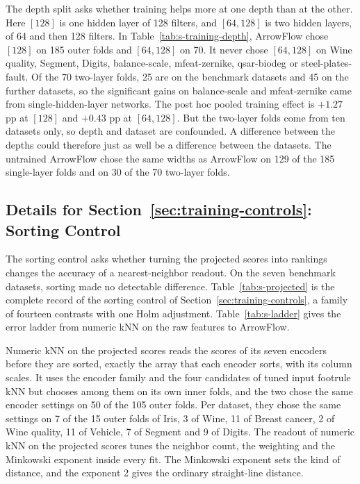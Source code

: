 The depth split asks whether training helps more at one depth than at the other. Here $[128]$ is one hidden layer of 128 filters, and $[64,128]$ is two hidden layers, of 64 and then 128 filters. In Table~\ref{tab:s-training-depth}, ArrowFlow chose $[128]$ on 185 outer folds and $[64,128]$ on 70. It never chose $[64,128]$ on Wine quality, Segment, Digits, balance-scale, mfeat-zernike, qsar-biodeg or steel-plates-fault. Of the 70 two-layer folds, 25 are on the benchmark datasets and 45 on the further datasets, so the significant gains on balance-scale and mfeat-zernike came from single-hidden-layer networks. The post hoc pooled training effect is $+1.27$ pp at $[128]$ and $+0.43$ pp at $[64,128]$. But the two-layer folds come from ten datasets only, so depth and dataset are confounded. A difference between the depths could therefore just as well be a difference between the datasets. The untrained ArrowFlow chose the same widths as ArrowFlow on 129 of the 185 single-layer folds and on 30 of the 70 two-layer folds.



\FloatBarrier
\subsection{Details for Section~\ref*{sec:training-controls}: Sorting Control}\label{supp:sorting}

The sorting control asks whether turning the projected scores into rankings changes the accuracy of a nearest-neighbor readout. On the seven benchmark datasets, sorting made no detectable difference. Table~\ref{tab:s-projected} is the complete record of the sorting control of Section~\ref{sec:training-controls}, a family of fourteen contrasts with one Holm adjustment. Table~\ref{tab:s-ladder} gives the error ladder from numeric kNN on the raw features to ArrowFlow.

Numeric kNN on the projected scores reads the scores of its seven encoders before they are sorted, exactly the array that each encoder sorts, with its column scales. It uses the encoder family and the four candidates of tuned input footrule kNN but chooses among them on its own inner folds, and the two chose the same encoder settings on 50 of the 105 outer folds. Per dataset, they chose the same settings on 7 of the 15 outer folds of Iris, 3 of Wine, 11 of Breast cancer, 2 of Wine quality, 11 of Vehicle, 7 of Segment and 9 of Digits. The readout of numeric kNN on the projected scores tunes the neighbor count, the weighting and the Minkowski exponent inside every fit. The Minkowski exponent sets the kind of distance, and the exponent 2 gives the ordinary straight-line distance.

